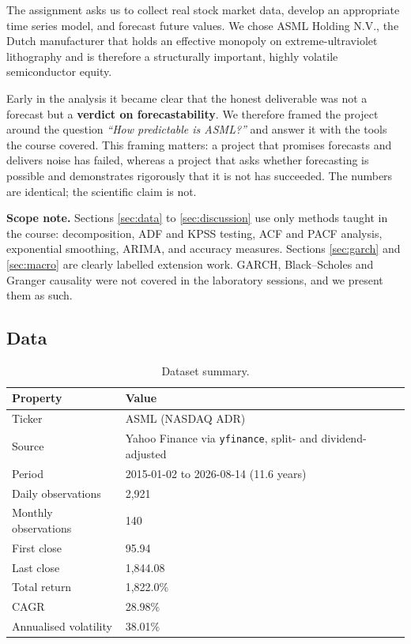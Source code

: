 \documentclass[12pt,a4paper]{article}
\newcommand{\code}[1]{{\small\texttt{#1}}}
\begin{document}
The assignment asks us to collect real stock market data, develop an appropriate
time series model, and forecast future values. We chose ASML Holding N.V., the
Dutch manufacturer that holds an effective monopoly on extreme-ultraviolet
lithography and is therefore a structurally important, highly volatile
semiconductor equity.

Early in the analysis it became clear that the honest deliverable was not a
forecast but a \textbf{verdict on forecastability}. We therefore framed the
project around the question \emph{``How predictable is ASML?''} and answer it
with the tools the course covered. This framing matters: a project that promises
forecasts and delivers noise has failed, whereas a project that asks whether
forecasting is possible and demonstrates rigorously that it is not has succeeded.
The numbers are identical; the scientific claim is not.

\textbf{Scope note.} Sections \ref{sec:data} to \ref{sec:discussion} use only
methods taught in the course: decomposition, ADF and KPSS testing, ACF and PACF
analysis, exponential smoothing, ARIMA, and accuracy measures. Sections
\ref{sec:garch} and \ref{sec:macro} are clearly labelled extension work. GARCH,
Black--Scholes and Granger causality were not covered in the laboratory sessions,
and we present them as such.

\subsection{Data}
\label{sec:introdata}

\begin{table}[H]\centering
\caption{Dataset summary.}\label{tab:data}
\begin{tabular}{@{}ll@{}}
\toprule
\textbf{Property} & \textbf{Value} \\
\midrule
Ticker              & ASML (NASDAQ ADR) \\
Source              & Yahoo Finance via \code{yfinance}, split- and dividend-adjusted \\
Period              & 2015-01-02 to 2026-08-14 (11.6 years) \\
Daily observations  & 2,921 \\
Monthly observations& 140 \\
First close         & 95.94 \\
Last close          & 1,844.08 \\
Total return        & 1,822.0\% \\
CAGR                & 28.98\% \\
Annualised volatility & 38.01\% \\
\bottomrule
\end{tabular}
\end{table}
\end{document}
